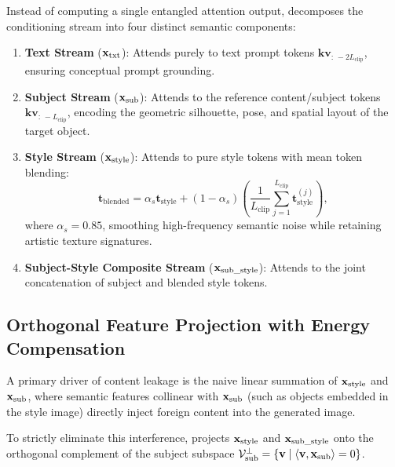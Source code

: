 Instead of computing a single entangled attention output, \method decomposes the conditioning stream into four distinct semantic components:
\begin{enumerate}
    \item \textbf{Text Stream} ($\mathbf{x}_{\text{txt}}$): Attends purely to text prompt tokens $\mathbf{kv}_{:\,-2L_{\text{clip}}}$, ensuring conceptual prompt grounding.
    \item \textbf{Subject Stream} ($\mathbf{x}_{\text{sub}}$): Attends to the reference content/subject tokens $\mathbf{kv}_{:\,-L_{\text{clip}}}$, encoding the geometric silhouette, pose, and spatial layout of the target object.
    \item \textbf{Style Stream} ($\mathbf{x}_{\text{style}}$): Attends to pure style tokens with mean token blending:
    \begin{equation}
        \mathbf{t}_{\text{blended}} = \alpha_s \mathbf{t}_{\text{style}} + (1 - \alpha_s) \left( \frac{1}{L_{\text{clip}}} \sum_{j=1}^{L_{\text{clip}}} \mathbf{t}_{\text{style}}^{(j)} \right),
    \end{equation}
    where $\alpha_s = 0.85$, smoothing high-frequency semantic noise while retaining artistic texture signatures.
    \item \textbf{Subject-Style Composite Stream} ($\mathbf{x}_{\text{sub\_style}}$): Attends to the joint concatenation of subject and blended style tokens.
\end{enumerate}

\subsection{Orthogonal Feature Projection with Energy Compensation}
\label{subsec:ortho_proj}
A primary driver of content leakage is the naive linear summation of $\mathbf{x}_{\text{style}}$ and $\mathbf{x}_{\text{sub}}$, where semantic features collinear with $\mathbf{x}_{\text{sub}}$ (such as objects embedded in the style image) directly inject foreign content into the generated image.

To strictly eliminate this interference, \method projects $\mathbf{x}_{\text{style}}$ and $\mathbf{x}_{\text{sub\_style}}$ onto the orthogonal complement of the subject subspace $\mathcal{V}_{\text{sub}}^\perp = \{ \mathbf{v} \mid \left\langle \mathbf{v}, \mathbf{x}_{\text{sub}} \right\rangle = 0 \}$.

